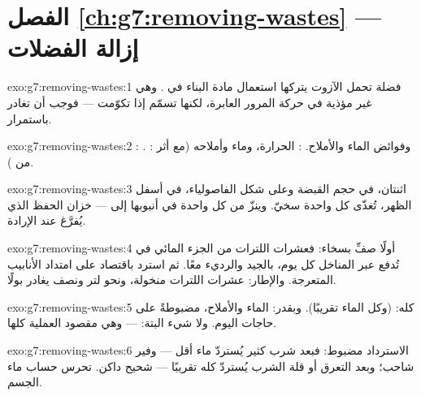 \section*{الفصل \ref{ch:g7:removing-wastes} --- إزالة الفضلات}

\begin{solution}{exo:g7:removing-wastes:1}
فضلة تحمل الآزوت يتركها استعمال  مادة البناء في . وهي
غير مؤذية في حركة المرور العابرة، لكنها تسمّم إذا تكوّمت --- فوجب
أن تغادر باستمرار.
\end{solution}

\begin{solution}{exo:g7:removing-wastes:2}
: . :  وفوائض الماء
والأملاح. : الحرارة، وماء  وأملاحه (مع أثر من
).
\end{solution}

\begin{solution}{exo:g7:removing-wastes:3}
اثنتان، في حجم القبضة وعلى شكل الفاصولياء، في أسفل الظهر، تُغذّى
كل واحدة  سخيّ. وينزّ  من كل واحدة في أنبوبها إلى
 --- خزان الحفظ الذي يُفرَّغ عند الإرادة.
\end{solution}

\begin{solution}{exo:g7:removing-wastes:4}
أولًا صفِّ بسخاء: فعشرات اللترات من الجزء المائي في  تُدفع عبر
المناخل كل يوم، بالجيد والرديء معًا. ثم استرد باقتصاد على امتداد
الأنابيب المتعرجة. والإطار: عشرات اللترات منخولة، ونحو لتر ونصف
يغادر بولًا.
\end{solution}

\begin{solution}{exo:g7:removing-wastes:5}
كله:  (وكل الماء تقريبًا). وبقدر: الماء والأملاح، مضبوطةً
على حاجات اليوم. ولا شيء البتة:  --- وهي مقصود العملية
كلها.
\end{solution}

\begin{solution}{exo:g7:removing-wastes:6}
الاسترداد مضبوط: فبعد شرب كثير يُستردّ ماء أقل ---  وفير
شاحب؛ وبعد التعرق أو قلة الشرب يُستردّ كله تقريبًا --- 
شحيح داكن.  تحرس حساب ماء الجسم.
\end{solution}

